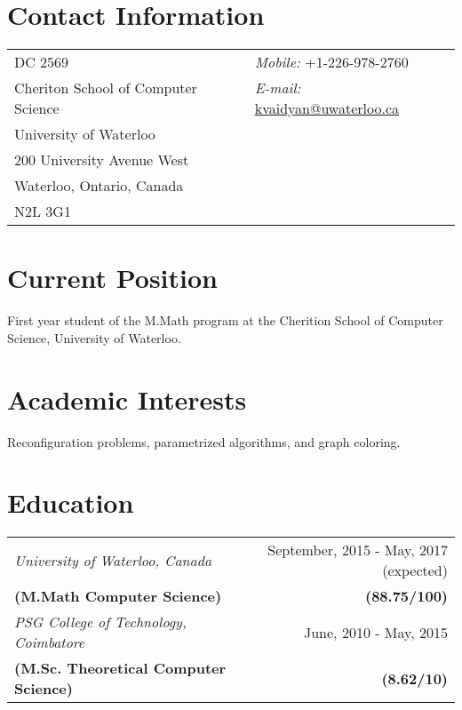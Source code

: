\documentclass[margin,line]{res}
\begin{document}

\begin{resume}
\section{\sc Contact Information}
\vspace{.05in}
\begin{tabular}{l l}
DC 2569				    & {\it Mobile:} +1-226-978-2760\\ 
Cheriton School of Computer Science  & {\it E-mail:}  \href{mailto:kvaidyan@uwaterloo.ca}{kvaidyan@uwaterloo.ca}\\    
University of Waterloo	             & \\
200 University Avenue West           & \\
Waterloo, Ontario, Canada	         & \\
N2L 3G1     
\end{tabular}

\section{\sc Current Position}
First year student of the M.Math program at the Cherition School of Computer Science, University
of Waterloo.

\section{\sc Academic Interests}
Reconfiguration problems, parametrized algorithms, and graph coloring. 
\section{\sc Education}
\begin{tabular}{l r}
\textit{University of Waterloo, Canada} & September, 2015 - May, 2017 (expected)\\
  \textbf{(M.Math Computer Science)} & \textbf{(88.75/100)}\\ 
\textit{PSG College of Technology, Coimbatore} & June, 2010 - May, 2015 \\
\textbf{(M.Sc. Theoretical Computer Science)} & \textbf{(8.62/10)}\\
\end{tabular}


\end{resume}
\end{document}
